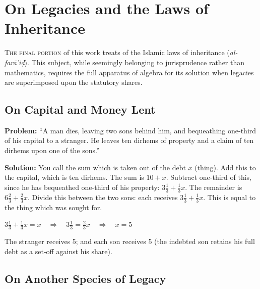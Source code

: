 \documentclass[11pt,a4paper,openany,oneside]{book}
\begin{document}
\newpage

\chapter{On Legacies and the Laws of Inheritance}
\label{ch:legacies}

\lettrine[lines=3, lhang=0.33, nindent=0em, findent=3pt]{
\textcolor{dropgold}{T}}{he final portion} of this work treats of the Islamic laws of inheritance
(\textit{al-farā'iḍ}). This subject, while seemingly belonging to jurisprudence
rather than mathematics, requires the full apparatus of algebra for its
solution when legacies are superimposed upon the statutory shares.

\section*{On Capital and Money Lent}

\textbf{Problem:} ``A man dies, leaving two sons behind him, and bequeathing
one-third of his capital to a stranger. He leaves ten dirhems of property and
a claim of ten dirhems upon one of the sons.''

\textbf{Solution:} You call the sum which is taken out of the debt $x$ (thing).
Add this to the capital, which is ten dirhems. The sum is $10 + x$.
Subtract one-third of this, since he has bequeathed one-third of his
property: $3\tfrac{1}{3} + \tfrac{1}{3}x$. The remainder is $6\tfrac{2}{3} +
\tfrac{2}{3}x$. Divide this between the two sons: each receives $3\tfrac{1}{3}
+ \tfrac{1}{3}x$. This is equal to the thing which was sought for.

\begin{mathbox}
$3\tfrac{1}{3} + \tfrac{1}{3}x = x \quad\Rightarrow\quad 3\tfrac{1}{3} = \tfrac{2}{3}x \quad\Rightarrow\quad x = 5$
\end{mathbox}

The stranger receives 5; and each son receives 5 (the indebted son retains
his full debt as a set-off against his share).

\section*{On Another Species of Legacy}
\end{document}
